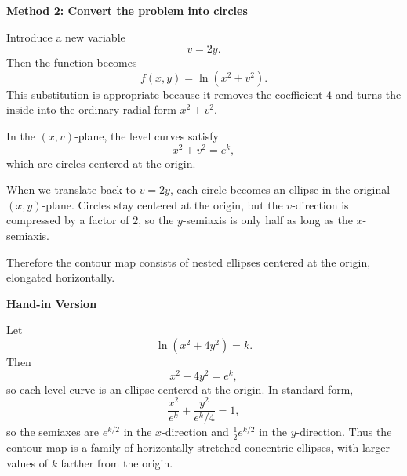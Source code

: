 \documentclass[a4paper,12pt,twocolumn]{article}
\newenvironment{solutionbox}{\begin{framed}}{\end{framed}}
\begin{document}
\begin{solutionbox}
\textbf{Method 2: Convert the problem into circles}

\begin{steps}
\item Introduce a new variable
\[
v=2y.
\]
Then the function becomes
\[
f(x,y)=\ln(x^2+v^2).
\]
This substitution is appropriate because it removes the coefficient \(4\) and turns the inside into the ordinary radial form \(x^2+v^2\).

\item In the \((x,v)\)-plane, the level curves satisfy
\[
x^2+v^2=e^k,
\]
which are circles centered at the origin.

\item When we translate back to \(v=2y\), each circle becomes an ellipse in the original \((x,y)\)-plane. Circles stay centered at the origin, but the \(v\)-direction is compressed by a factor of \(2\), so the \(y\)-semiaxis is only half as long as the \(x\)-semiaxis.

\item Therefore the contour map consists of nested ellipses centered at the origin, elongated horizontally.
\end{steps}
\end{solutionbox}

\begin{solutionbox}
\textbf{Hand-in Version}

Let
\[
\ln(x^2+4y^2)=k.
\]
Then
\[
x^2+4y^2=e^k,
\]
so each level curve is an ellipse centered at the origin. In standard form,
\[
\frac{x^2}{e^k}+\frac{y^2}{e^k/4}=1,
\]
so the semiaxes are \(e^{k/2}\) in the \(x\)-direction and \(\tfrac12 e^{k/2}\) in the \(y\)-direction. Thus the contour map is a family of horizontally stretched concentric ellipses, with larger values of \(k\) farther from the origin.

\begin{center}
\end{center}
\end{solutionbox}
\end{document}
